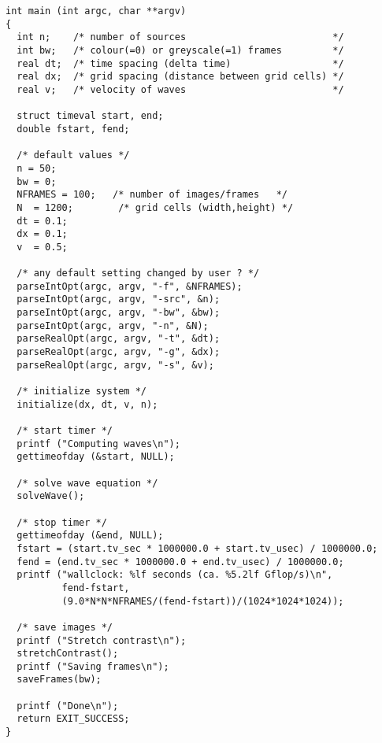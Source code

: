 \documentclass[a4paper]{article}
\begin{document}
\begin{verbatim}
int main (int argc, char **argv)
{
  int n;    /* number of sources                          */
  int bw;   /* colour(=0) or greyscale(=1) frames         */
  real dt;  /* time spacing (delta time)                  */
  real dx;  /* grid spacing (distance between grid cells) */
  real v;   /* velocity of waves                          */

  struct timeval start, end;
  double fstart, fend;

  /* default values */
  n = 50;
  bw = 0;
  NFRAMES = 100;   /* number of images/frames   */
  N  = 1200;        /* grid cells (width,height) */
  dt = 0.1;
  dx = 0.1;
  v  = 0.5;

  /* any default setting changed by user ? */
  parseIntOpt(argc, argv, "-f", &NFRAMES);
  parseIntOpt(argc, argv, "-src", &n);
  parseIntOpt(argc, argv, "-bw", &bw);
  parseIntOpt(argc, argv, "-n", &N);
  parseRealOpt(argc, argv, "-t", &dt);
  parseRealOpt(argc, argv, "-g", &dx);
  parseRealOpt(argc, argv, "-s", &v);

  /* initialize system */
  initialize(dx, dt, v, n);

  /* start timer */
  printf ("Computing waves\n");
  gettimeofday (&start, NULL);

  /* solve wave equation */
  solveWave();

  /* stop timer */
  gettimeofday (&end, NULL);
  fstart = (start.tv_sec * 1000000.0 + start.tv_usec) / 1000000.0;
  fend = (end.tv_sec * 1000000.0 + end.tv_usec) / 1000000.0;
  printf ("wallclock: %lf seconds (ca. %5.2lf Gflop/s)\n", 
          fend-fstart, 
          (9.0*N*N*NFRAMES/(fend-fstart))/(1024*1024*1024));

  /* save images */
  printf ("Stretch contrast\n");
  stretchContrast();
  printf ("Saving frames\n");
  saveFrames(bw);

  printf ("Done\n");
  return EXIT_SUCCESS;
}
\end{verbatim}
\end{document}
